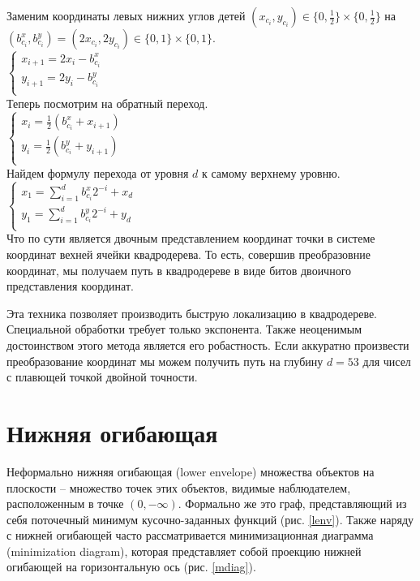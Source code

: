Заменим координаты левых нижних углов детей $(x_{c_i}, y_{c_i}) \in \{0, \frac{1}{2}\} \times \{0, \frac{1}{2}\}$
на $(b^x_{c_i}, b^y_{c_i}) = (2x_{c_i}, 2y_{c_i}) \in \{0, 1\} \times \{0, 1\}$.\\
$
\left\{
\begin{array}{l}
x_{i+1} = 2x_i - b^x_{c_i}  \\
y_{i+1} = 2y_i - b^y_{c_i}  \\
\end{array}
\right.$
\\
Теперь посмотрим на обратный переход.\\
$
\left\{
\begin{array}{l}
x_i = \frac{1}{2}(b^x_{c_i} + x_{i+1})  \\
y_i = \frac{1}{2}(b^y_{c_i} + y_{i+1})  \\
\end{array}
\right.$
\\
Найдем формулу перехода от уровня $d$ к самому верхнему уровню.\\
$
\left\{
\begin{array}{l}
x_1 = \sum\limits_{i=1}^db^x_{c_i}2^{-i} + x_d  \\
y_1 = \sum\limits_{i=1}^db^y_{c_i}2^{-i} + y_d  \\
\end{array}
\right.$
\\
Что по сути является двочным представлением координат точки в системе координат вехней ячейки квадродерева.
То есть, совершив преобразовние координат, мы получаем путь в квадродереве в виде битов
двоичного представления координат.

Эта техника позволяет производить быструю локализацию в квадродереве. 
Специальной обработки требует только экспонента. Также неоценимым достоинством этого метода
является его робастность. Если аккуратно произвести преобразование координат мы можем
получить путь на глубину $d = 53$ для чисел с плавющей точкой двойной точности.

\FloatBarrier
\section{Нижняя огибающая}
Неформально нижняя огибающая (lower envelope) множества объектов на плоскости –
множество точек этих объектов, видимые наблюдателем, расположенным в
точке $(0, -\infty)$. Формально же это граф, представляющий из себя поточечный
минимум кусочно-заданных функций \cite{LENV} (рис. \ref{lenv}).
Также наряду с нижней огибающей часто рассматривается минимизационная диаграмма
(minimization diagram), которая представляет собой проекцию нижней огибающей на
горизонтальную ось (рис. \ref{mdiag}). 

